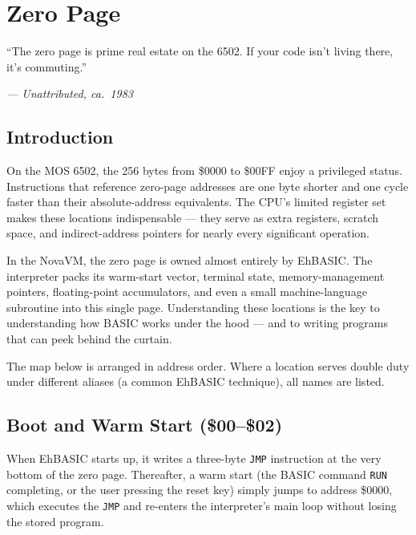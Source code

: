 \chapter{Zero Page}

\epigraph{``The zero page is prime real estate on the 6502. If your code isn't
living there, it's commuting.''}{\textit{--- Unattributed, ca.\ 1983}}

\section*{Introduction}

On the MOS 6502, the 256 bytes from \$0000 to \$00FF enjoy a privileged
status.  Instructions that reference zero-page addresses are one byte shorter
and one cycle faster than their absolute-address equivalents.  The CPU's
limited register set makes these locations indispensable --- they serve as
extra registers, scratch space, and indirect-address pointers for nearly every
significant operation.

In the NovaVM, the zero page is owned almost entirely by EhBASIC.  The
interpreter packs its warm-start vector, terminal state, memory-management
pointers, floating-point accumulators, and even a small machine-language
subroutine into this single page.  Understanding these locations is the key to
understanding how BASIC works under the hood --- and to writing programs that
can peek behind the curtain.

The map below is arranged in address order.  Where a location serves double
duty under different aliases (a common EhBASIC technique), all names are
listed.

\section{Boot and Warm Start (\$00--\$02)}

When EhBASIC starts up, it writes a three-byte \texttt{JMP} instruction at the
very bottom of the zero page.  Thereafter, a warm start (the BASIC command
\texttt{RUN} completing, or the user pressing the reset key) simply jumps to
address \$0000, which executes the \texttt{JMP} and re-enters the interpreter's
main loop without losing the stored program.

